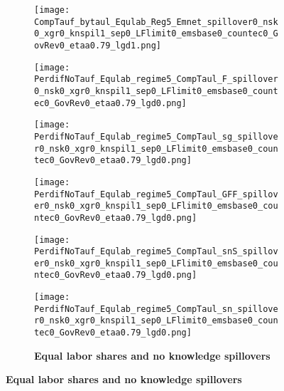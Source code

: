 \begin{figure}[h!!]
	\begin{subfigure}{0.75\textwidth}
	\caption{\textbf{Equal labor shares and no knowledge spillovers}}
	\begin{minipage}[]{0.32\textwidth}
		\texttt{[image: CompTauf\_bytaul\_Equlab\_Reg5\_Emnet\_spillover0\_nsk0\_xgr0\_knspil1\_sep0\_LFlimit0\_emsbase0\_countec0\_GovRev0\_etaa0.79\_lgd1.png]}
	\end{minipage}	
	\begin{minipage}[]{0.32\textwidth}
		\texttt{[image: PerdifNoTauf\_Equlab\_regime5\_CompTaul\_F\_spillover0\_nsk0\_xgr0\_knspil1\_sep0\_LFlimit0\_emsbase0\_countec0\_GovRev0\_etaa0.79\_lgd0.png]}
	\end{minipage}
	\begin{minipage}[]{0.32\textwidth}
	\texttt{[image: PerdifNoTauf\_Equlab\_regime5\_CompTaul\_sg\_spillover0\_nsk0\_xgr0\_knspil1\_sep0\_LFlimit0\_emsbase0\_countec0\_GovRev0\_etaa0.79\_lgd0.png]}
\end{minipage}
	\begin{minipage}[]{0.32\textwidth}
		\texttt{[image: PerdifNoTauf\_Equlab\_regime5\_CompTaul\_GFF\_spillover0\_nsk0\_xgr0\_knspil1\_sep0\_LFlimit0\_emsbase0\_countec0\_GovRev0\_etaa0.79\_lgd0.png]}
	\end{minipage}
\begin{minipage}[]{0.32\textwidth}
\texttt{[image: PerdifNoTauf\_Equlab\_regime5\_CompTaul\_snS\_spillover0\_nsk0\_xgr0\_knspil1\_sep0\_LFlimit0\_emsbase0\_countec0\_GovRev0\_etaa0.79\_lgd0.png]}
\end{minipage}
\begin{minipage}[]{0.32\textwidth}
\texttt{[image: PerdifNoTauf\_Equlab\_regime5\_CompTaul\_sn\_spillover0\_nsk0\_xgr0\_knspil1\_sep0\_LFlimit0\_emsbase0\_countec0\_GovRev0\_etaa0.79\_lgd0.png]}
\end{minipage}
\end{subfigure}		
\end{figure} 
\clearpage


